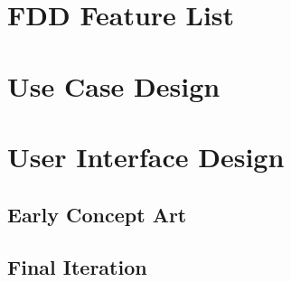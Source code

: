 \section{FDD Feature List}

\section{Use Case Design}

\section{User Interface Design}

\subsection{Early Concept Art}

\subsection{Final Iteration}